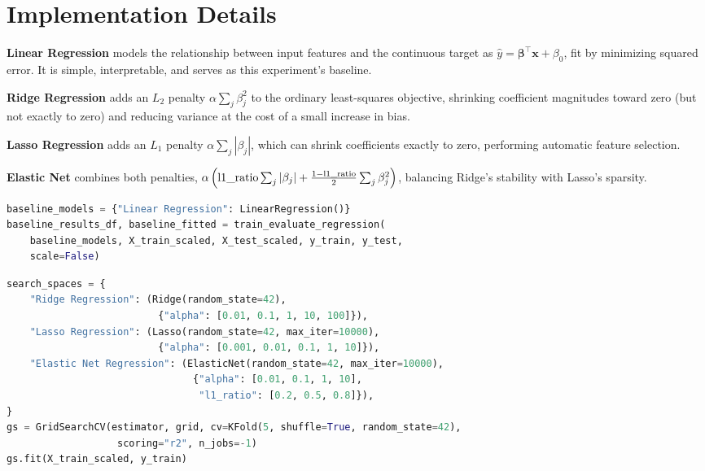 \documentclass[12pt,a4paper]{article}
\DeclareRobustCommand{\_}{\textunderscore\allowbreak}
\begin{document}
\section{Implementation Details}

\textbf{Linear Regression} models the relationship between input features
and the continuous target as $\hat{y} = \boldsymbol\beta^\top\mathbf{x} +
\beta_0$, fit by minimizing squared error. It is simple, interpretable, and
serves as this experiment's baseline.

\textbf{Ridge Regression} adds an $L_2$ penalty
$\alpha\sum_j\beta_j^2$ to the ordinary least-squares objective, shrinking
coefficient magnitudes toward zero (but not exactly to zero) and reducing
variance at the cost of a small increase in bias.

\textbf{Lasso Regression} adds an $L_1$ penalty $\alpha\sum_j|\beta_j|$,
which can shrink coefficients exactly to zero, performing automatic feature
selection.

\textbf{Elastic Net} combines both penalties,
$\alpha\left(\text{l1\_ratio}\sum_j|\beta_j| + \tfrac{1-\text{l1\_ratio}}{2}\sum_j\beta_j^2\right)$,
balancing Ridge's stability with Lasso's sparsity.

\begin{lstlisting}[language=Python, caption={Reusable regression training call, from \texttt{ml\_lab\_utils.py} (Experiment 1) applied to the baseline model.}]
baseline_models = {"Linear Regression": LinearRegression()}
baseline_results_df, baseline_fitted = train_evaluate_regression(
    baseline_models, X_train_scaled, X_test_scaled, y_train, y_test,
    scale=False)
\end{lstlisting}

\begin{lstlisting}[language=Python, caption={Hyperparameter search space and GridSearchCV/RandomizedSearchCV tuning, from \texttt{experiment3\_loan\_regression.py}.}]
search_spaces = {
    "Ridge Regression": (Ridge(random_state=42),
                          {"alpha": [0.01, 0.1, 1, 10, 100]}),
    "Lasso Regression": (Lasso(random_state=42, max_iter=10000),
                          {"alpha": [0.001, 0.01, 0.1, 1, 10]}),
    "Elastic Net Regression": (ElasticNet(random_state=42, max_iter=10000),
                                {"alpha": [0.01, 0.1, 1, 10],
                                 "l1_ratio": [0.2, 0.5, 0.8]}),
}
gs = GridSearchCV(estimator, grid, cv=KFold(5, shuffle=True, random_state=42),
                   scoring="r2", n_jobs=-1)
gs.fit(X_train_scaled, y_train)
\end{lstlisting}
\end{document}
